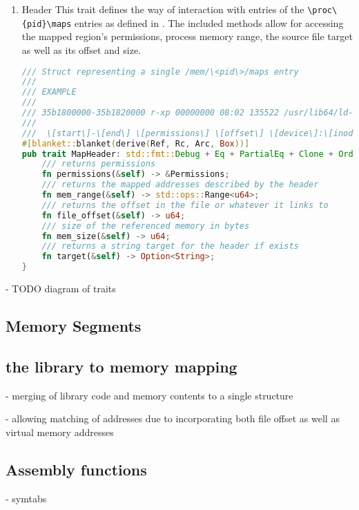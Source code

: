 \begin{enumerate}
    \item \label{reader:header}Header
    This trait defines the way of interaction with entries of the \verb|\proc\{pid}\maps| entries as defined in \cite{kerrisk_proc_pid_maps5_2024}.
    The included methods allow for accessing the mapped region's permissions, process memory range, the source file target as well as its offset and size. 
\begin{lstlisting}[caption=\label{lst:header}"The Header Trait definition", language=Rust]
/// Struct representing a single /mem/\<pid\>/maps entry
///
/// EXAMPLE
///
/// 35b1800000-35b1820000 r-xp 00000000 08:02 135522 /usr/lib64/ld-2.15.so
///
///  \[start\]-\[end\] \[permissions\] \[offset\] \[device\]:\[inode\] \[links_to\]
#[blanket::blanket(derive(Ref, Rc, Arc, Box))]
pub trait MapHeader: std::fmt::Debug + Eq + PartialEq + Clone + Ord {
    /// returns permissions
    fn permissions(&self) -> &Permissions;
    /// returns the mapped addresses described by the header
    fn mem_range(&self) -> std::ops::Range<u64>;
    /// returns the offset in the file or whatever it links to
    fn file_offset(&self) -> u64;
    /// size of the referenced memory in bytes
    fn mem_size(&self) -> u64;
    /// returns a string target for the header if exists
    fn target(&self) -> Option<String>;
}    
\end{lstlisting}
 
\end{enumerate}

- TODO diagram of traits

\subsection{Memory Segments}

\subsection{the library to memory mapping}

- merging of library code and memory contents to a single structure

- allowing matching of addresses due to incorporating both file offset as well as virtual memory addresses

\subsection{Assembly functions}

- symtabs


